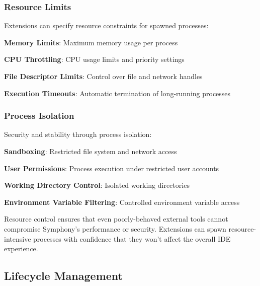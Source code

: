 \subsubsection*{Resource Limits}

Extensions can specify resource constraints for spawned processes:

\begin{compactlist}
    \item \textbf{Memory Limits}: Maximum memory usage per process
    \item \textbf{CPU Throttling}: CPU usage limits and priority settings
    \item \textbf{File Descriptor Limits}: Control over file and network handles
    \item \textbf{Execution Timeouts}: Automatic termination of long-running processes
\end{compactlist}

\subsubsection*{Process Isolation}

Security and stability through process isolation:

\begin{compactlist}
    \item \textbf{Sandboxing}: Restricted file system and network access
    \item \textbf{User Permissions}: Process execution under restricted user accounts
    \item \textbf{Working Directory Control}: Isolated working directories
    \item \textbf{Environment Variable Filtering}: Controlled environment variable access
\end{compactlist}

\begin{successbox}
Resource control ensures that even poorly-behaved external tools cannot compromise Symphony's performance or security. Extensions can spawn resource-intensive processes with confidence that they won't affect the overall IDE experience.
\end{successbox}

\subsection*{Lifecycle Management}

